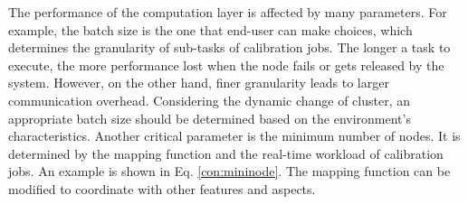 The performance of the computation layer is affected by many parameters. 
For example, the batch size is the one that end-user can make choices, which determines the granularity of sub-tasks of calibration jobs. 
The longer a task to execute, the more performance lost when the node fails or gets released by the system. 
However, on the other hand, finer granularity leads to larger communication overhead. 
Considering the dynamic change of cluster, an appropriate batch size should be determined based on the environment’s characteristics.
Another critical parameter is the minimum number of nodes. 
It is determined by the mapping function and the real-time workload of calibration jobs. 
An example is shown in Eq. \eqref{con:mininode}.
The mapping function can be modified to coordinate with other features and aspects.
 



